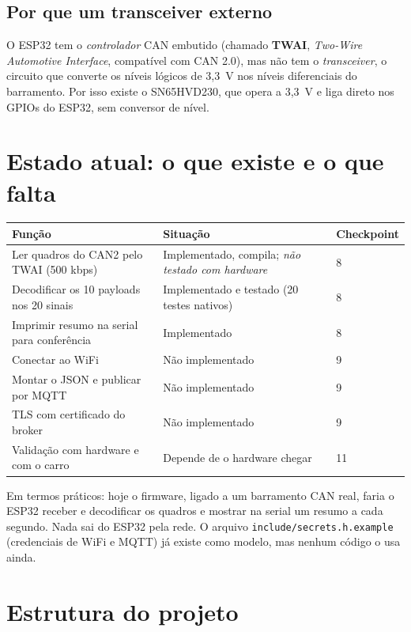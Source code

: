 \documentclass[11pt,a4paper]{article}
\begin{document}
\subsection{Por que um transceiver externo}

O ESP32 tem o \emph{controlador} CAN embutido (chamado \textbf{TWAI}, \emph{Two-Wire Automotive Interface}, compatível com CAN 2.0), mas não tem o \emph{transceiver}, o circuito que converte os níveis lógicos de 3,3~V nos níveis diferenciais do barramento. Por isso existe o SN65HVD230, que opera a 3,3~V e liga direto nos GPIOs do ESP32, sem conversor de nível.

\section{Estado atual: o que existe e o que falta}

\begin{center}
\begin{tabularx}{\textwidth}{lYl}
\toprule
\textbf{Função} & \textbf{Situação} & \textbf{Checkpoint} \\
\midrule
Ler quadros do CAN2 pelo TWAI (500 kbps) & Implementado, compila; \emph{não testado com hardware} & 8 \\
Decodificar os 10 payloads nos 20 sinais & Implementado e testado (20 testes nativos) & 8 \\
Imprimir resumo na serial para conferência & Implementado & 8 \\
Conectar ao WiFi & Não implementado & 9 \\
Montar o JSON e publicar por MQTT & Não implementado & 9 \\
TLS com certificado do broker & Não implementado & 9 \\
Validação com hardware e com o carro & Depende de o hardware chegar & 11 \\
\bottomrule
\end{tabularx}
\end{center}

Em termos práticos: hoje o firmware, ligado a um barramento CAN real, faria o ESP32 receber e decodificar os quadros e mostrar na serial um resumo a cada segundo. Nada sai do ESP32 pela rede. O arquivo \texttt{include/secrets.h.example} (credenciais de WiFi e MQTT) já existe como modelo, mas nenhum código o usa ainda.

\section{Estrutura do projeto}
\end{document}
